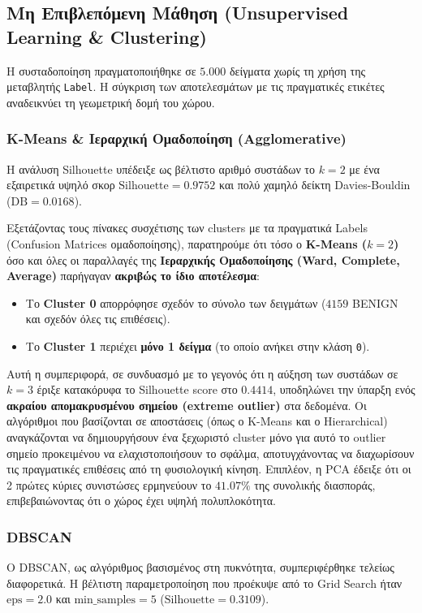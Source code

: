 \documentclass[11pt,a4paper]{article}
\begin{document}
	\subsection{Μη Επιβλεπόμενη Μάθηση (Unsupervised Learning \& Clustering)}
	Η συσταδοποίηση πραγματοποιήθηκε σε $5.000$ δείγματα χωρίς τη χρήση της μεταβλητής \texttt{Label}. Η σύγκριση των αποτελεσμάτων με τις πραγματικές ετικέτες αναδεικνύει τη γεωμετρική δομή του χώρου.
	
	\subsubsection{K-Means \& Ιεραρχική Ομαδοποίηση (Agglomerative)}
	Η ανάλυση Silhouette υπέδειξε ως βέλτιστο αριθμό συστάδων το $k=2$ με ένα εξαιρετικά υψηλό σκορ $\text{Silhouette} = 0.9752$ και πολύ χαμηλό δείκτη Davies-Bouldin ($\text{DB} = 0.0168$). 
	
	Εξετάζοντας τους πίνακες συσχέτισης των clusters με τα πραγματικά Labels (Confusion Matrices ομαδοποίησης), παρατηρούμε ότι τόσο ο \textbf{K-Means ($k=2$)} όσο και όλες οι παραλλαγές της \textbf{Ιεραρχικής Ομαδοποίησης (Ward, Complete, Average)} παρήγαγαν \textbf{ακριβώς το ίδιο αποτέλεσμα}:
	\begin{itemize}
		\item Το \textbf{Cluster 0} απορρόφησε σχεδόν το σύνολο των δειγμάτων ($4159$ BENIGN και σχεδόν όλες τις επιθέσεις).
		\item Το \textbf{Cluster 1} περιέχει \textbf{μόνο 1 δείγμα} (το οποίο ανήκει στην κλάση \texttt{0}).
	\end{itemize}
	Αυτή η συμπεριφορά, σε συνδυασμό με το γεγονός ότι η αύξηση των συστάδων σε $k=3$ έριξε κατακόρυφα το Silhouette score στο $0.4414$, υποδηλώνει την ύπαρξη ενός \textbf{ακραίου απομακρυσμένου σημείου (extreme outlier)} στα δεδομένα. Οι αλγόριθμοι που βασίζονται σε αποστάσεις (όπως ο K-Means και ο Hierarchical) αναγκάζονται να δημιουργήσουν ένα ξεχωριστό cluster μόνο για αυτό το outlier σημείο προκειμένου να ελαχιστοποιήσουν το σφάλμα, αποτυγχάνοντας να διαχωρίσουν τις πραγματικές επιθέσεις από τη φυσιολογική κίνηση. Επιπλέον, η PCA έδειξε ότι οι 2 πρώτες κύριες συνιστώσες ερμηνεύουν το $41.07\%$ της συνολικής διασποράς, επιβεβαιώνοντας ότι ο χώρος έχει υψηλή πολυπλοκότητα.
	
	\subsubsection{DBSCAN}
	Ο DBSCAN, ως αλγόριθμος βασισμένος στη πυκνότητα, συμπεριφέρθηκε τελείως διαφορετικά. Η βέλτιστη παραμετροποίηση που προέκυψε από το Grid Search ήταν $\text{eps}=2.0$ και $\text{min\_samples}=5$ ($\text{Silhouette} = 0.3109$).
	
\end{document}
